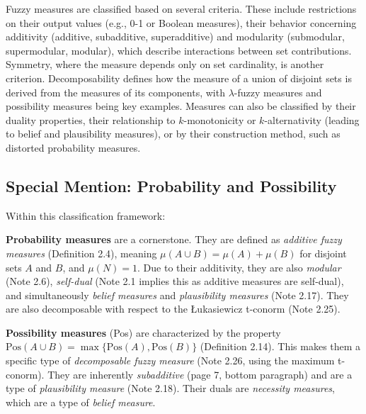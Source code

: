 Fuzzy measures are classified based on several criteria. These include restrictions on their output values (e.g., 0-1 or Boolean measures), their behavior concerning additivity (additive, subadditive, superadditive) and modularity (submodular, supermodular, modular), which describe interactions between set contributions. Symmetry, where the measure depends only on set cardinality, is another criterion. Decomposability defines how the measure of a union of disjoint sets is derived from the measures of its components, with $\lambda$-fuzzy measures and possibility measures being key examples. Measures can also be classified by their duality properties, their relationship to $k$-monotonicity or $k$-alternativity (leading to belief and plausibility measures), or by their construction method, such as distorted probability measures.

\subsection*{Special Mention: Probability and Possibility}

Within this classification framework:

\textbf{Probability measures} are a cornerstone. They are defined as \textit{additive fuzzy measures} (Definition 2.4), meaning $\mu(A \cup B) = \mu(A) + \mu(B)$ for disjoint sets $A$ and $B$, and $\mu(N)=1$. Due to their additivity, they are also \textit{modular} (Note 2.6), \textit{self-dual} (Note 2.1 implies this as additive measures are self-dual), and simultaneously \textit{belief measures} and \textit{plausibility measures} (Note 2.17). They are also decomposable with respect to the Łukasiewicz t-conorm (Note 2.25).

\textbf{Possibility measures} (Pos) are characterized by the property $\text{Pos}(A \cup B) = \max\{\text{Pos}(A), \text{Pos}(B)\}$ (Definition 2.14). This makes them a specific type of \textit{decomposable fuzzy measure} (Note 2.26, using the maximum t-conorm). They are inherently \textit{subadditive} (page 7, bottom paragraph) and are a type of \textit{plausibility measure} (Note 2.18). Their duals are \textit{necessity measures}, which are a type of \textit{belief measure}.

